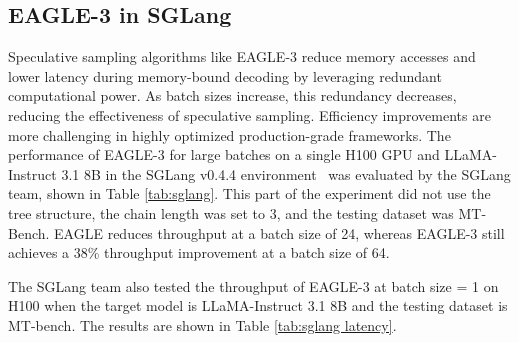 \documentclass[11pt]{article}
\begin{document}
\subsection{EAGLE-3 in SGLang}

Speculative sampling algorithms like EAGLE-3 reduce memory accesses and lower latency during memory-bound decoding by leveraging redundant computational power. As batch sizes increase, this redundancy decreases, reducing the effectiveness of speculative sampling. Efficiency improvements are more challenging in highly optimized production-grade frameworks.
The performance of EAGLE-3 for large batches on a single H100 GPU and LLaMA-Instruct 3.1 8B in the SGLang v0.4.4 environment~\cite{zheng2024sglang} was evaluated by the SGLang team, shown in Table \ref{tab:sglang}. This part of the experiment did not use the tree structure, the chain length was set to 3, and the testing dataset was MT-Bench. EAGLE reduces throughput at a batch size of 24, whereas EAGLE-3 still achieves a 38\% throughput improvement at a batch size of 64.


\begin{table}[h]
  \centering
  \caption{Throughput improvement under different batch sizes on H100 and LLaMA-Instruct 3.1 8B for the MT-Bench dataset, with SGLang without speculative sampling as the baseline (1.00x). The experiments were conducted by the SGLang team.}
  \label{tab:sglang}%
\end{table}%

The SGLang team also tested the throughput of EAGLE-3 at batch size = 1 on H100 when the target model is LLaMA-Instruct 3.1 8B and the testing dataset is MT-bench. The results are shown in Table \ref{tab:sglang latency}.

\begin{table}[h]
  \centering
  \caption{Throughput at batch size = 1 on H100 when the target model is LLaMA-Instruct 3.1 8B and the testing dataset is MT-bench. The experiments were conducted by the SGLang team.}
  \label{tab:sglang latency}%
\end{table}%
\end{document}
